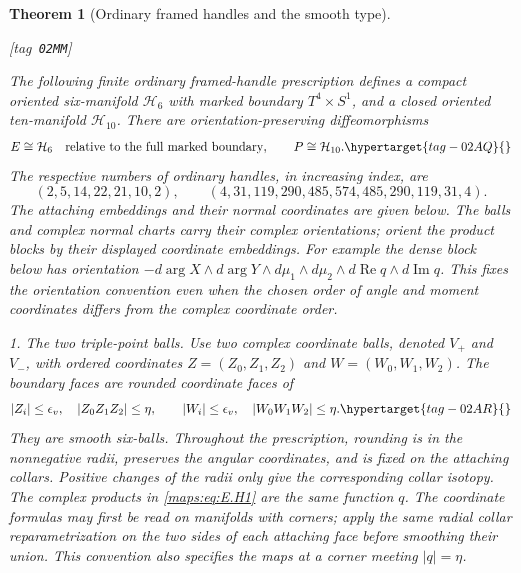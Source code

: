\documentclass[11pt,a4paper]{article}
\numberwithin{equation}{section}
\newtheorem{theorem}{Theorem}[section]
\theoremstyle{definition}
\newcommand{\StatementRecord}[4]{{\upshape\footnotesize[tag~\texttt{#3}]}\enspace\ignorespaces}
\begin{document}
\begin{theorem}[Ordinary framed handles and the smooth type]\hypertarget{tag-02MM}{}\label{maps:src:E.2.21}\hypertarget{tag-02MO}{}\label{maps:src:E.2.4}
\StatementRecord{maps:src:E.2.21}{proved}{02MM}{\eqref{maps:eq:E.T4}, \cref{maps:src:E.2.20}, \eqref{maps:eq:E.U3}, \eqref{maps:eq:E.U4}, \cref{maps:src:E.2.19}, \eqref{maps:eq:E.T6}, \eqref{maps:eq:E.H13}; \cite[Section~4.1, equation~(16), p.~103]{mapsVogel09}; \cite{mapsMilnor65}}


The following finite ordinary framed-handle prescription defines a
compact oriented six-manifold $\mathcal H_6$ with marked boundary
$T^4\times S^1$, and a closed oriented ten-manifold $\mathcal H_{10}$.
There are orientation-preserving diffeomorphisms
\begin{equation}
 E\cong\mathcal H_6\quad\hbox{relative to the full marked boundary},
 \qquad P\cong\mathcal H_{10}.
 \hypertarget{tag-02AQ}{}\label{maps:eq:E.H0}
\end{equation}
The respective numbers of ordinary handles, in increasing index, are
\[
 (2,5,14,22,21,10,2),\qquad
 (4,31,119,290,485,574,485,290,119,31,4).
\]
The attaching embeddings and their normal coordinates are given below.  
The balls and complex normal charts carry their complex orientations;
orient the product blocks by their displayed coordinate embeddings.
For example the dense block below has orientation
$-d\arg X\wedge d\arg Y\wedge d\mu_1\wedge d\mu_2
\wedge d\operatorname{Re}q\wedge d\operatorname{Im}q$.
This fixes the orientation convention even when the chosen order of
angle and moment coordinates differs from the complex coordinate order.

\emph{1. The two triple-point balls.}
Use two complex coordinate balls, denoted $V_+$ and $V_-$, with
ordered coordinates $Z=(Z_0,Z_1,Z_2)$ and $W=(W_0,W_1,W_2)$.
The boundary faces are rounded coordinate faces of
\begin{equation}
 |Z_i|\leq\epsilon_v,\quad |Z_0Z_1Z_2|\leq\eta,
 \qquad
 |W_i|\leq\epsilon_v,\quad |W_0W_1W_2|\leq\eta.
 \hypertarget{tag-02AR}{}\label{maps:eq:E.H1}
\end{equation}
They are smooth six-balls.  Throughout the prescription, rounding is
in the nonnegative radii, preserves the angular coordinates, and is
fixed on the attaching collars.  Positive changes of the radii only
give the corresponding collar isotopy.  The complex products in
\eqref{maps:eq:E.H1} are the same function $q$.
The coordinate formulas may first be read on manifolds with corners;
apply the same radial collar reparametrization on the two sides of
each attaching face before smoothing their union.  This convention
also specifies the maps at a corner meeting $|q|=\eta$.


\end{theorem}
\end{document}

